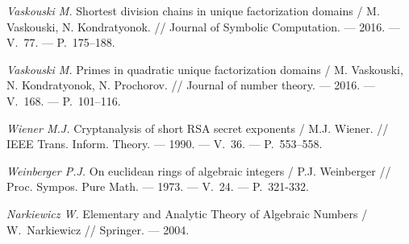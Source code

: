 \begin{thebibliography}{99}
\textit{Vaskouski M.} Shortest division chains in unique factorization domains / M. Vaskouski, N. Kondratyonok. // Journal of Symbolic Computation. --- 2016. --- V.~77. --- P.~175--188.

\textit{Vaskouski M.} Primes in quadratic unique factorization domains / M. Vaskouski, N. Kondratyonok, N. Prochorov. // Journal of number theory. --- 2016. --- V.~168. --- P.~101--116.

\textit{Wiener M.J.} Cryptanalysis of short RSA secret exponents / M.J. Wiener. // IEEE Trans. Inform. Theory. --- 1990. --- V.~36. --- P.~553--558.

\textit{Weinberger P.J.} On euclidean rings of algebraic integers / P.J. Weinberger // Proc. Sympos. Pure Math. --- 1973. --- V.~24. --- P.~321-332.

\textit{Narkiewicz W.} Elementary and Analytic Theory of Algebraic Numbers / W.~Narkiewicz // Springer. --- 2004.
\end{thebibliography}
